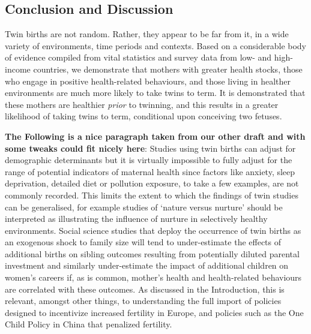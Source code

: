 \documentclass[subeqn]{article}
\begin{document}
\begin{spacing}{1.4}
\section*{Conclusion and Discussion}                   \label{TWINscn:conclusion}
Twin births are not random.  Rather, they appear to be far from it, in a wide
variety of environments, time periods and contexts.  Based on a considerable 
body of evidence compiled from vital statistics and survey data from low- and 
high-income countries, we demonstrate that mothers with greater health stocks,
those who engage in positive health-related behaviours, and those living in 
healther environments are much more likely to take twins to term.  It is 
demonstrated that these mothers are healthier \emph{prior} to twinning, and
this results in a greater likelihood of taking twins to term, conditional upon
conceiving two fetuses.

\textbf{The Following is a nice paragraph taken from our other draft and with some tweaks could fit nicely here}:
Studies using twin births can adjust for demographic determinants but it is virtually impossible to fully adjust for the range of potential indicators of maternal health since factors like anxiety, sleep deprivation, detailed diet or pollution exposure, to take a few examples, are not commonly recorded. This limits the extent to which the findings of twin studies can be generalised, for example studies of `nature versus nurture' should be interpreted as illustrating the influence of nurture in selectively healthy environments. Social science studies that deploy the occurrence of twin births as an exogenous shock to family size will tend to under-estimate the effects of additional births on sibling outcomes resulting from potentially diluted parental investment and similarly under-estimate the impact of additional children on women's careers if, as is common, mother's health and health-related behaviours are correlated with these outcomes. As discussed in the Introduction, this is relevant, amongst other things, to understanding the full import of policies designed to incentivize increased fertility in Europe, and policies such as the One Child Policy in China that penalized fertility.


\end{spacing}
\end{document}
